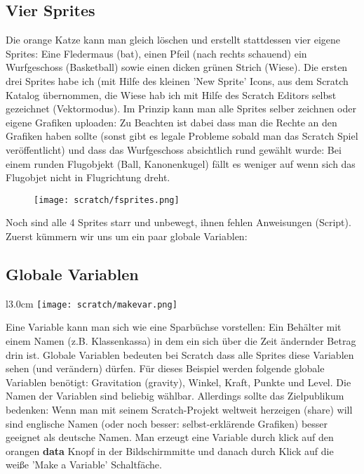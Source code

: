 \documentclass[10pt,a4paper,ngerman,twoside]{article} %
\begin{document}
\subsection*{Vier Sprites}

Die orange Katze kann man gleich löschen und erstellt stattdessen vier eigene Sprites: Eine Fledermaus (bat), einen Pfeil (nach rechts schauend) ein Wurfgeschoss (Basketball) sowie einen dicken grünen Strich (Wiese). Die ersten drei Sprites habe ich (mit Hilfe des kleinen 'New Sprite' Icons, aus dem Scratch Katalog übernommen, die Wiese hab ich mit Hilfe des Scratch Editors selbst gezeichnet (Vektormodus). Im Prinzip kann man alle Sprites selber zeichnen oder eigene Grafiken uploaden: Zu Beachten ist dabei dass man die Rechte an den Grafiken haben sollte (sonst gibt es legale Probleme sobald man das Scratch Spiel veröffentlicht) und dass das Wurfgeschoss absichtlich rund gewählt wurde: Bei einem runden Flugobjekt (Ball, Kanonenkugel) fällt es weniger auf wenn sich das Flugobjet nicht in Flugrichtung dreht.

\begin{figure}
\texttt{[image: scratch/fsprites.png]}
\end{figure}

Noch sind alle 4 Sprites starr und unbewegt, ihnen fehlen Anweisungen (Script). Zuerst kümmern wir uns um ein paar globale Variablen:
\newpage
\subsection*{Globale Variablen}

\begin{wrapfigure}{l}{3.0cm}
\texttt{[image: scratch/makevar.png]}
\end{wrapfigure}
Eine Variable kann man sich wie eine Sparbüchse vorstellen: Ein Behälter mit einem Namen (z.B. Klassenkassa) in dem ein sich über die Zeit ändernder Betrag drin ist. Globale Variablen bedeuten bei Scratch dass alle Sprites diese Variablen sehen (und verändern) dürfen. Für dieses Beispiel werden folgende globale Variablen benötigt: Gravitation (gravity), Winkel, Kraft, Punkte und Level. Die Namen der Variablen sind beliebig wählbar. Allerdings sollte das Zielpublikum bedenken: Wenn man mit seinem Scratch-Projekt weltweit herzeigen (share) will sind englische Namen (oder noch besser: selbst-erklärende Grafiken) besser geeignet als deutsche Namen. Man erzeugt eine Variable durch klick auf den orangen \textbf{data} Knopf in der Bildschirmmitte und danach durch Klick auf die weiße 'Make a Variable' Schaltfäche.
\end{document}
